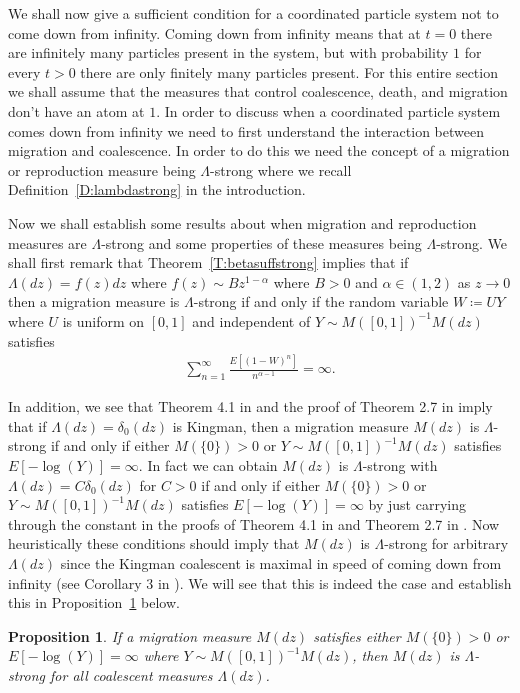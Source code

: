 \documentclass[11pt]{article}
\newtheorem{proposition}{Proposition}
\theoremstyle{definition}
\newcommand{\thmref}[1]{Theorem~\ref{T:#1}}
\newcommand{\defref}[1]{Definition~\ref{D:#1}}
\newcommand{\propref}[1]{Proposition~\ref{P:#1}}
\begin{document}
\noindent We shall now give a sufficient condition for a coordinated particle system not to come down from infinity. Coming down from infinity means that at $t = 0$ there are infinitely many particles present in the system, but with probability $1$ for every $t > 0$ there are only finitely many particles present. For this entire section we shall assume that the measures that control coalescence, death, and migration don't have an atom at $1$. In order to discuss when a coordinated particle system comes down from infinity we need to first understand the interaction between migration and coalescence. In order to do this we need the concept of a migration or reproduction measure being $\Lambda$-strong where we recall \defref{lambdastrong} in the introduction.
\medskip

\noindent Now we shall establish some results about when migration and reproduction measures are $\Lambda$-strong and some properties of these measures being $\Lambda$-strong. We shall first remark that \thmref{betasuffstrong} implies that if $\Lambda(dz) = f(z)dz$ where $f(z) \sim Bz^{1-\alpha}$ where $B> 0$ and $\alpha \in (1,2)$ as $z \to 0$ then a migration measure is $\Lambda$-strong if and only if the random variable $W \coloneqq UY$ where $U$ is uniform on $[0,1]$ and independent of $Y \sim M([0,1])^{-1}M(dz)$ satisfies
%
\begin{align*}
    \sum_{n = 1}^\infty \frac{E[(1-W)^{n}]}{n^{\alpha - 1}} = \infty.
\end{align*}

\noindent In addition, we see that Theorem 4.1 in \cite{seedbank1} and the proof of Theorem 2.7 in \cite{seedbank2} imply that if $\Lambda(dz) = \delta_0(dz)$ is Kingman, then a migration measure $M(dz)$ is $\Lambda$-strong if and only if either $M(\{0\}) > 0$ or $Y \sim M([0,1])^{-1}M(dz)$ satisfies $E[-\log(Y)] = \infty$. In fact we can obtain $M(dz)$ is $\Lambda$-strong with $\Lambda(dz) = C\delta_0(dz)$ for $C >0$ if and only if either $M(\{0\}) > 0$ or $Y \sim M([0,1])^{-1}M(dz)$ satisfies $E[-\log(Y)] = \infty$ by just carrying through the constant in the proofs of Theorem 4.1 in \cite{seedbank1} and Theorem 2.7 in \cite{seedbank2}. Now heuristically these conditions should imply that $M(dz)$ is $\Lambda$-strong for arbitrary $\Lambda(dz)$ since the Kingman coalescent is maximal in speed of coming down from infinity (see Corollary 3 in \cite{speed}). We will see that this is indeed the case and establish this in \propref{arblambdastrong} below.

\begin{proposition}\label{P:arblambdastrong}
    If a migration measure $M(dz)$ satisfies either $M(\{0\}) > 0$ or $E[-\log(Y)] = \infty$ where $Y \sim M([0,1])^{-1}M(dz)$, then $M(dz)$ is $\Lambda$-strong for all coalescent measures $\Lambda(dz)$.
\end{proposition}
\end{document}
